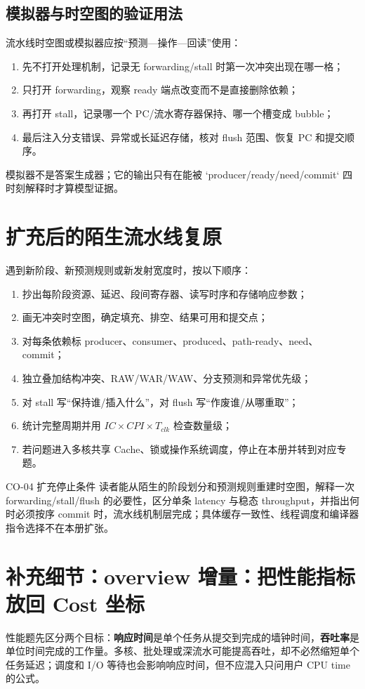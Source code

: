 \documentclass[UTF8,fontset=fandol,11pt,a4paper]{ctexart}
\newcommand{\kw}[1]{\textbf{\color{deep}#1}}
\begin{document}
\subsection{模拟器与时空图的验证用法}

流水线时空图或模拟器应按“预测—操作—回读”使用：
\begin{enumerate}
  \item 先不打开处理机制，记录无 forwarding/stall 时第一次冲突出现在哪一格；
  \item 只打开 forwarding，观察 ready 端点改变而不是直接删除依赖；
  \item 再打开 stall，记录哪一个 PC/流水寄存器保持、哪一个槽变成 bubble；
  \item 最后注入分支错误、异常或长延迟存储，核对 flush 范围、恢复 PC 和提交顺序。
\end{enumerate}
模拟器不是答案生成器；它的输出只有在能被 `producer/ready/need/commit` 四时刻解释时才算模型证据。

\section{扩充后的陌生流水线复原}

遇到新阶段、新预测规则或新发射宽度时，按以下顺序：
\begin{enumerate}
  \item 抄出每阶段资源、延迟、段间寄存器、读写时序和存储响应参数；
  \item 画无冲突时空图，确定填充、排空、结果可用和提交点；
  \item 对每条依赖标 producer、consumer、produced、path-ready、need、commit；
  \item 独立叠加结构冲突、RAW/WAR/WAW、分支预测和异常优先级；
  \item 对 stall 写“保持谁/插入什么”，对 flush 写“作废谁/从哪重取”；
  \item 统计完整周期并用 $IC\times CPI\times T_{clk}$ 检查数量级；
  \item 若问题进入多核共享 Cache、锁或操作系统调度，停止在本册并转到对应专题。
\end{enumerate}

\begin{methodbox}{CO-04 扩充停止条件}
读者能从陌生的阶段划分和预测规则重建时空图，解释一次 forwarding/stall/flush 的必要性，区分单条 latency 与稳态 throughput，并指出何时必须按序 commit 时，流水线机制层完成；具体缓存一致性、线程调度和编译器指令选择不在本册扩张。
\end{methodbox}

\section{补充细节：overview 增量：把性能指标放回 Cost 坐标}
性能题先区分两个目标：\kw{响应时间}是单个任务从提交到完成的墙钟时间，\kw{吞吐率}是单位时间完成的工作量。多核、批处理或深流水可能提高吞吐，却不必然缩短单个任务延迟；调度和 I/O 等待也会影响响应时间，但不应混入只问用户 CPU time 的公式。
\end{document}
